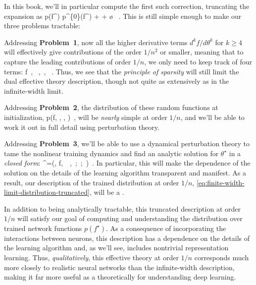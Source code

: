 In this book, we'll in particular compute the first such correction, truncating the expansion as
\be\label{eq:finite-width-limit-distribution-truncated}
p(f^\star) \equiv p^{\{0\}}(f^\star) +  + \o{} \, .
\ee
This  is still simple enough to make our three problems tractable: 
\bi
\item Addressing \textbf{Problem~1}, now all the higher derivative terms $d^k f/d\theta^k$ for $k\geq 4$ will effectively give contributions  of the order $1/n^2$ or smaller, meaning that to capture the leading contributions of order $1/n$, we only need to keep track of four terms:
\be\label{eq:example-of-sparsity-finite-n-1}
f\, , \quad {}\, , \quad {}\,, \quad {}\, .
\ee
Thus, we see that the \emph{principle of sparsity} will still limit the dual effective theory description, though not quite as
extensively
as in the infinite-width limit.
\item Addressing \textbf{Problem~2}, the distribution of these random functions at initialization,
\be\label{eq:example-of-sparsity-finite-n-2}
p\!\le(f, , ,  \ri)\, ,
\ee
will be \emph{nearly} simple at order $1/n$, and we'll be able to work it out in full detail using perturbation theory. 
\item Addressing \textbf{Problem~3}, we'll be able to use a dynamical perturbation theory to tame the nonlinear training  dynamics and find an analytic solution for $\theta^\star$ in a \emph{closed form}:
\be\label{eq:example-of-sparsity-finite-n-3}
\theta^\star=\le[\theta^{\star}\ri]\le(\theta, f,\, \, ,\, ;\, ;\, \ri)\, .
\ee
In particular, this will make the dependence of the solution on the details of the learning algorithm transparent and manifest.
\ei
As a result, our description of the trained distribution at order $1/n$, \eqref{eq:finite-width-limit-distribution-truncated},  will be a . 





In addition to being analytically tractable, this truncated description at order $1/n$ will satisfy our goal of computing and understanding the distribution over trained network functions
$p(f^\star)$. As a consequence of incorporating the interactions between neurons, this description has a dependence on the details of the learning algorithm and, as we'll see, includes nontrivial representation learning. Thus, \emph{qualitatively}, this effective theory at order $1/n$ corresponds much more closely to realistic neural networks than the infinite-width description, making it far more useful as a theoretically  for understanding deep learning. 

